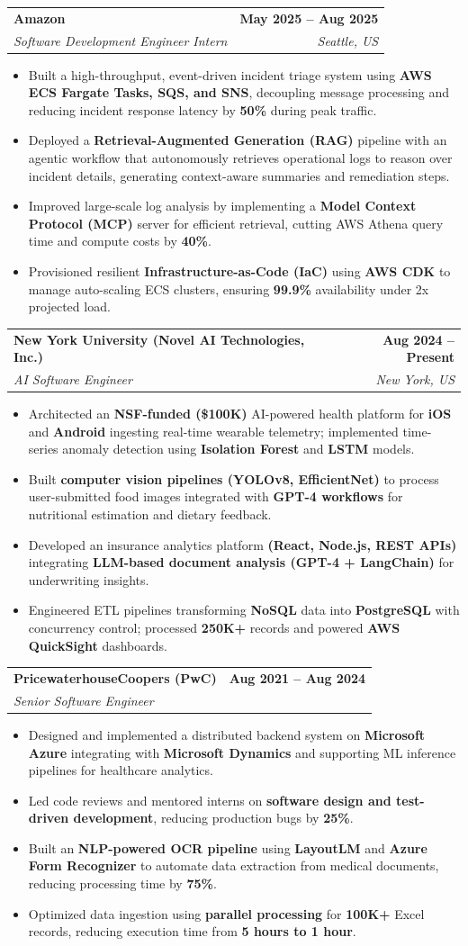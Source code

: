 \documentclass[letterpaper,10pt]{article}
\makeatletter
\newcommand{\resumeItem}[1]{
\item\small{{#1}\vspace{-3.5pt}}
}
\newcommand{\resumeSubheading}[4]{
\vspace{6pt}
\item
\begin{tabular*}{1.0\textwidth}[t]{l@{\extracolsep{\fill}}r}
\textbf{#1} & \textbf{\small #2} \\
\textit{\small#3} & \textit{\small #4} \\
\end{tabular*}\vspace{-5.5pt}
}
\newcommand{\resumeItemListStart}{\begin{itemize}[leftmargin=*, itemsep=0pt, topsep=0pt]}
\newcommand{\resumeItemListEnd}{\end{itemize}\vspace{-3pt}}
\makeatother
\begin{document}
\resumeSubheading
  {Amazon}{May 2025 -- Aug 2025}
  {Software Development Engineer Intern}{Seattle, US}
\resumeItemListStart
  \resumeItem{Built a high-throughput, event-driven incident triage system using \textbf{AWS ECS Fargate Tasks, SQS, and SNS}, decoupling message processing and reducing incident response latency by \textbf{50\%} during peak traffic.}
  \resumeItem{Deployed a \textbf{Retrieval-Augmented Generation (RAG)} pipeline with an agentic workflow that autonomously retrieves operational logs to reason over incident details, generating context-aware summaries and remediation steps.}
  \resumeItem{Improved large-scale log analysis by implementing a \textbf{Model Context Protocol (MCP)} server for efficient retrieval, cutting AWS Athena query time and compute costs by \textbf{40\%}.}
  \resumeItem{Provisioned resilient \textbf{Infrastructure-as-Code (IaC)} using \textbf{AWS CDK} to manage auto-scaling ECS clusters, ensuring \textbf{99.9\%} availability under 2x projected load.}
\resumeItemListEnd

\resumeSubheading
  {New York University (Novel AI Technologies, Inc.)}{Aug 2024 -- Present}
  {AI Software Engineer}{New York, US}
\resumeItemListStart
  \resumeItem{Architected an \textbf{NSF-funded (\$100K)} AI-powered health platform for \textbf{iOS} and \textbf{Android} ingesting real-time wearable telemetry; implemented time-series anomaly detection using \textbf{Isolation Forest} and \textbf{LSTM} models.}
  \resumeItem{Built \textbf{computer vision pipelines (YOLOv8, EfficientNet)} to process user-submitted food images integrated with \textbf{GPT-4 workflows} for nutritional estimation and dietary feedback.}
  \resumeItem{Developed an insurance analytics platform \textbf{(React, Node.js, REST APIs)} integrating \textbf{LLM-based document analysis (GPT-4 + LangChain)} for underwriting insights.}
  \resumeItem{Engineered ETL pipelines transforming \textbf{NoSQL} data into \textbf{PostgreSQL} with concurrency control; processed \textbf{250K+} records and powered \textbf{AWS QuickSight} dashboards.}
\resumeItemListEnd

\resumeSubheading
  {PricewaterhouseCoopers (PwC)}{Aug 2021 -- Aug 2024}
  {Senior Software Engineer}{}
\resumeItemListStart
  \resumeItem{Designed and implemented a distributed backend system on \textbf{Microsoft Azure} integrating with \textbf{Microsoft Dynamics} and supporting ML inference pipelines for healthcare analytics.}
  \resumeItem{Led code reviews and mentored interns on \textbf{software design and test-driven development}, reducing production bugs by \textbf{25\%}.}
  \resumeItem{Built an \textbf{NLP-powered OCR pipeline} using \textbf{LayoutLM} and \textbf{Azure Form Recognizer} to automate data extraction from medical documents, reducing processing time by \textbf{75\%}.}
  \resumeItem{Optimized data ingestion using \textbf{parallel processing} for \textbf{100K+} Excel records, reducing execution time from \textbf{5 hours to 1 hour}.}
\resumeItemListEnd
\end{document}
